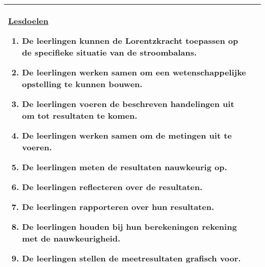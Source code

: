 \begin{landscape}
\begin{tabularx}{1.56\textwidth}{|p{}|X|}
\begin{itemize}[itemsep=0.08\baselineskip]
		\end{itemize}
		\underline{Lesdoelen}\newline
		\vspace{-0.75cm}
		\begin{enumerate}[itemsep=0.08\baselineskip]
			\item De leerlingen kunnen de Lorentzkracht toepassen op de specifieke situatie van de stroombalans.
			\item De leerlingen werken samen om een wetenschappelijke opstelling te kunnen bouwen.
			\item De leerlingen voeren de beschreven handelingen uit om tot resultaten te komen.
			\item De leerlingen werken samen om de metingen uit te voeren.
			\item De leerlingen meten de resultaten nauwkeurig op.
			\item De leerlingen reflecteren over de resultaten.
			\item De leerlingen rapporteren over hun resultaten.
			\item De leerlingen houden bij hun berekeningen rekening met de nauwkeurigheid.
			\item De leerlingen stellen de meetresultaten grafisch voor.
		\end{enumerate} \\\hline
	\end{tabularx}



\end{landscape}
